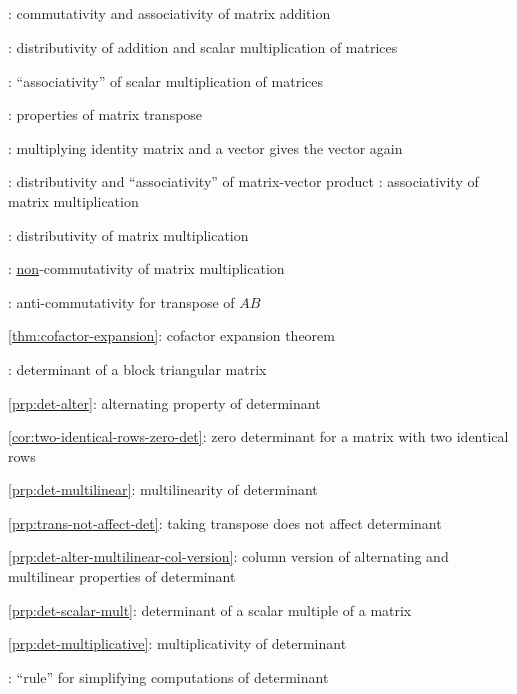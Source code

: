 \subsection*{}
\item {}: commutativity and associativity of
matrix addition
\item {}: distributivity of addition
and scalar multiplication of matrices
\item {}: ``associativity'' of scalar multiplication of matrices
\item {}: properties of matrix transpose
\item {}: multiplying identity matrix and a vector gives the vector again
\item {}: distributivity and ``associativity'' of matrix-vector product
: associativity of matrix multiplication
\item {}: distributivity of matrix multiplication
\item {}: \underline{non}-commutativity of matrix multiplication
\item {}: anti-commutativity for transpose of \(AB\)
\item \cref{thm:cofactor-expansion}: cofactor expansion theorem
\item {}: determinant of a block triangular matrix
\item \cref{prp:det-alter}: alternating property of determinant
\item \cref{cor:two-identical-rows-zero-det}: zero determinant for a matrix with two identical rows
\item \cref{prp:det-multilinear}: multilinearity of determinant
\item \cref{prp:trans-not-affect-det}: taking transpose does not affect determinant
\item \cref{prp:det-alter-multilinear-col-version}: column version of alternating and multilinear properties of determinant
\item \cref{prp:det-scalar-mult}: determinant of a scalar multiple of a matrix
\item \cref{prp:det-multiplicative}: multiplicativity of determinant
\item {}: ``rule'' for simplifying computations of determinant
